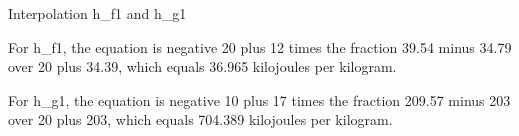 Interpolation h_f1 and h_g1

For h_f1, the equation is negative 20 plus 12 times the fraction 39.54 minus 34.79 over 20 plus 34.39, which equals 36.965 kilojoules per kilogram.

For h_g1, the equation is negative 10 plus 17 times the fraction 209.57 minus 203 over 20 plus 203, which equals 704.389 kilojoules per kilogram.